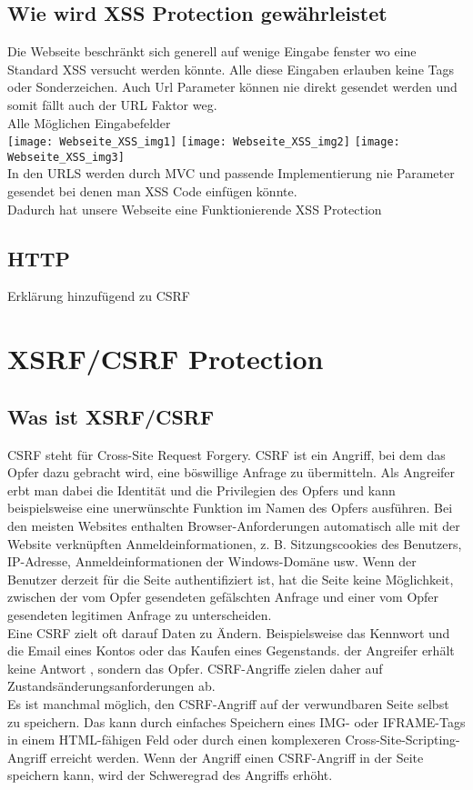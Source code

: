 {\subsection{Wie wird XSS Protection gewährleistet}
\label{sec:xss_prot}
Die Webseite beschränkt sich generell auf wenige Eingabe fenster wo eine Standard XSS versucht werden könnte. Alle diese Eingaben erlauben keine Tags oder Sonderzeichen. Auch Url Parameter können nie direkt gesendet werden und somit fällt auch der URL Faktor weg.
\\
Alle Möglichen Eingabefelder
\\
\texttt{[image: Webseite\_XSS\_img1]}
\texttt{[image: Webseite\_XSS\_img2]}
\texttt{[image: Webseite\_XSS\_img3]}
\\
In den URLS werden durch MVC und passende Implementierung nie Parameter gesendet bei denen man XSS Code einfügen könnte.\\
Dadurch hat unsere Webseite eine Funktionierende XSS Protection
\subsection{HTTP}
Erklärung hinzufügend zu CSRF
\section{XSRF/CSRF Protection}
\label{sec:csrf}
\subsection{Was ist XSRF/CSRF}
\label{sec:xsrf_what}
CSRF steht für Cross-Site Request Forgery. CSRF ist ein Angriff, bei dem das Opfer dazu gebracht wird, eine böswillige Anfrage zu übermitteln. Als Angreifer erbt man dabei die Identität und die Privilegien des Opfers und kann beispielsweise eine unerwünschte Funktion im Namen des Opfers ausführen. Bei den meisten Websites enthalten Browser-Anforderungen automatisch alle mit der Website verknüpften Anmeldeinformationen, z. B. Sitzungscookies des Benutzers, IP-Adresse, Anmeldeinformationen der Windows-Domäne usw. Wenn der Benutzer derzeit für die Seite authentifiziert ist, hat die Seite keine Möglichkeit, zwischen der vom Opfer gesendeten gefälschten Anfrage und einer vom Opfer gesendeten legitimen Anfrage zu unterscheiden.
\\
Eine CSRF zielt oft darauf Daten zu Ändern. Beispielsweise das Kennwort und die Email eines Kontos oder das Kaufen eines Gegenstands.   der Angreifer erhält keine Antwort , sondern das Opfer. CSRF-Angriffe zielen daher auf Zustandsänderungsanforderungen ab.
\\
Es ist manchmal möglich, den CSRF-Angriff auf der verwundbaren Seite selbst zu speichern. Das kann durch einfaches Speichern eines IMG- oder IFRAME-Tags in einem HTML-fähigen Feld oder durch einen komplexeren Cross-Site-Scripting-Angriff erreicht werden. Wenn der Angriff einen CSRF-Angriff in der Seite speichern kann, wird der Schweregrad des Angriffs erhöht. 
}

